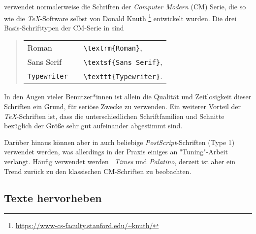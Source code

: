 \latex verwendet normalerweise die Schriften der \emph{Computer Modern} (CM)
Serie, die so wie die \emph{TeX}-Software selbst von Donald Knuth%
\footnote{\url{https://www-cs-faculty.stanford.edu/~knuth/}}
entwickelt wurden. Die drei Basis-Schrifttypen der CM-Serie in \latex sind
%
\begin{quote}
    \begin{tabular}{lcl}
        \textrm{Roman}      & & \verb!\textrm{Roman}!,      \\
        \textsf{Sans Serif} & & \verb!\textsf{Sans Serif}!, \\
        \texttt{Typewriter} & & \verb!\texttt{Typewriter}!.
    \end{tabular}
\end{quote}
%
\noindent In den Augen vieler Benutzer*innen ist allein die Qualität und
Zeitlosigkeit dieser Schriften ein Grund, \latex für seriöse Zwecke zu
verwenden. Ein weiterer Vorteil der \emph{TeX}-Schriften ist, dass die
unterschiedlichen Schriftfamilien und Schnitte bezüglich der Größe sehr gut
aufeinander abgestimmt sind.

Darüber hinaus können aber in \latex auch beliebige
\emph{PostScript}-Schrif\-ten (Type 1) verwendet werden, was allerdings in
der Praxis einiges an "Tuning"-Arbeit verlangt. Häufig verwendet werden \zB\
\emph{Times} und \emph{Palatino}, derzeit ist aber ein Trend zurück zu den
klassischen CM-Schriften zu beobachten.

\subsection{Texte hervorheben}

